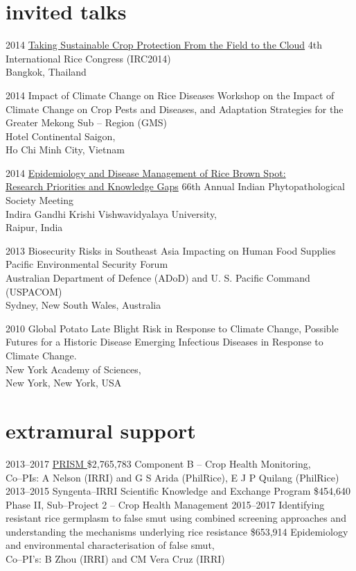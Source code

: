 \documentclass[]{friggeri-cv}
\begin{document}
\section*{invited talks}
\begin{entrylist}
 \entry
	{2014}
	{\href{http://figshare.com/articles/Taking_Sustainable_Crop_Protection_From_the_Field_to_the_Cloud/1225800}{Taking Sustainable Crop Protection From the Field to the Cloud}}
	{}
	{4th International Rice Congress (IRC2014)\\Bangkok, Thailand}
	{}
	
\entry
 	{2014}
	{Impact of Climate Change on Rice Diseases}
	{}
	{Workshop on the Impact of Climate Change on Crop Pests and Diseases, and Adaptation Strategies for the Greater Mekong Sub -- Region (GMS)\\Hotel Continental Saigon,\\Ho Chi Minh City, Vietnam}
	
 \entry
 	{2014}
	{\href{http://figshare.com/articles/IPS_2014/1037569}{Epidemiology and Disease Management of Rice Brown Spot:\\Research Priorities and Knowledge Gaps}}
	{}
	{66th Annual Indian Phytopathological Society Meeting\\Indira Gandhi Krishi Vishwavidyalaya University,\\Raipur, India}
	
 \entry
	{2013}
	{Biosecurity Risks in Southeast Asia Impacting on Human Food Supplies}
	{}
	{Pacific Environmental Security Forum\\Australian Department of Defence (ADoD) and U. S. Pacific Command (USPACOM)\\Sydney, New South Wales, Australia}

 \entry
	 {2010} 
	{Global Potato Late Blight Risk in Response to Climate Change, Possible Futures for a Historic Disease}
  	{}
  	{Emerging Infectious Diseases in Response to Climate Change.\\New York Academy of Sciences,\\New York, New York, USA}
\end{entrylist}

\section*{extramural support}
  \begin{entrylist}
  \entry
	{2013--2017}
	{\href{http://philippinericeinfo.ph/}{PRISM }}
	{\$2,765,783}
	{Component B -- Crop Health Monitoring,\\Co--PIs: A Nelson (IRRI) and G S Arida (PhilRice), E J P Quilang (PhilRice)}
  \entry
	{2013--2015}
	{Syngenta--IRRI Scientific Knowledge and Exchange Program}
	{\$454,640}
	{Phase II, Sub--Project 2 -- Crop Health Management}
  \entry
    {2015--2017}
    {Identifying resistant rice germplasm to false smut using combined screening approaches and understanding the mechanisms underlying rice resistance}
    {\$653,914}
    {Epidemiology and environmental characterisation of false smut,\\Co--PI's: B Zhou (IRRI) and CM Vera Cruz (IRRI)}
  \end{entrylist}


\end{document}
